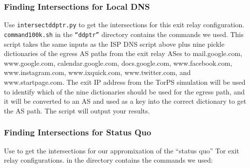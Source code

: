 \documentclass{article}
\begin{document}
\subsubsection{Finding Intersections for Local DNS}
Use {\tt intersect\textunderscore ddptr.py} to get the intersections for this 
exit relay configuration. {\tt command\textunderscore 100k.sh} in the {\tt ``ddptr''} 
directory contains the commands we used. This script takes the same inputs as the ISP 
DNS script above plus nine pickle dictionaries of the egress AS paths from the 
exit relay ASes to mail.google.com, www.google.com, calendar.google.com, 
docs.google.com, www.facebook.com, www.instagram.com, www.ixquick.com, www.twitter.com, 
and www.startpage.com. The exit IP address from the TorPS simulation will be used 
to identify which of the nine dictionaries should be used for the egress path, and 
it will be converted to an AS and used as a key into the correct dictionary to get 
the AS path. The script will output your results.

\subsubsection{Finding Intersections for Status Quo}
Use  to get the 
intersections for our appromixation of the ``status quo'' Tor exit relay 
configurations.  in the directory
 contains the commands we used: 
\end{document}
